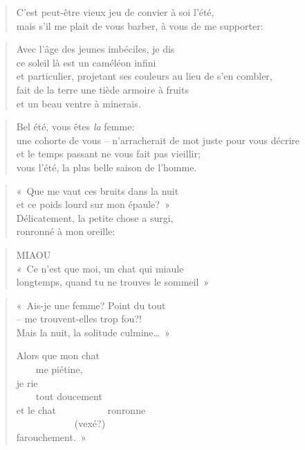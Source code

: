   \begin{verse}
    C’est peut-être vieux jeu de convier à soi l’été,\\
    mais s’il me plait de vous barber, à vous de me supporter:
  \end{verse}
  \begin{verse}
    Avec l’âge des jeunes imbéciles, je dis\\
    ce soleil là est un caméléon infini\\
    et particulier, projetant ses couleurs au lieu de s’en combler,\\
    fait de la terre une tiède armoire à fruits\\
    et un beau ventre à minerais.
  \end{verse}
  \begin{verse}
    Bel été, vous êtes \emph{la} femme:\\
    une cohorte de vous -- n’arracherait de mot juste pour vous décrire\\
    et le temps passant ne vous fait pas vieillir;\\
    vous l’été, la plus belle saison de l’homme.
  \end{verse}
  \begin{verse}
    «~Que me vaut ces bruits dans la nuit\\
    et ce poids lourd sur mon épaule?~»\\
    Délicatement, la petite chose a surgi,\\
    ronronné à mon oreille:
  \end{verse}
  \begin{verse}
    MIAOU\\
    «~Ce n’est que moi, un chat qui miaule\\
    longtemps, quand tu ne trouves le sommeil~»
  \end{verse}
  \begin{verse}
    «~Ais-je une femme? Point du tout\\
    -- me trouvent-elles trop fou?!\\
    Mais la nuit, la solitude culmine…~»

    Alors que mon chat\\
    ~~~~me piétine,\\
    je rie\\
    ~~~~tout doucement\\
    et le chat ~~~~~~~~~~ronronne\\
    ~~~~~~~~~~~~(vexé?)\\
    farouchement.~»
  \end{verse}
